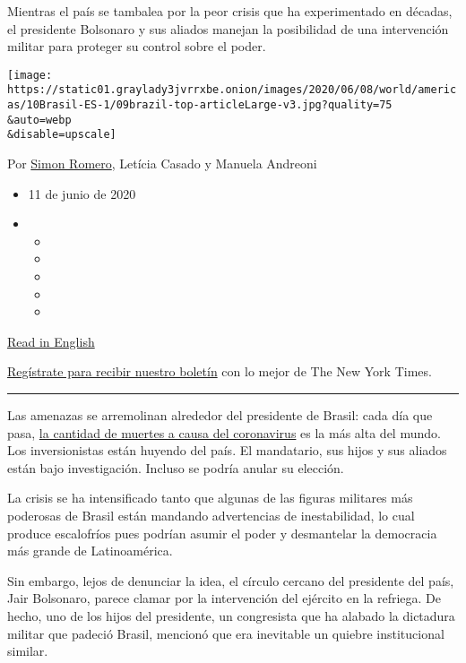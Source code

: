Mientras el país se tambalea por la peor crisis que ha experimentado en
décadas, el presidente Bolsonaro y sus aliados manejan la posibilidad de
una intervención militar para proteger su control sobre el poder.

\texttt{[image: https://static01.graylady3jvrrxbe.onion/images/2020/06/08/world/americas/10Brasil-ES-1/09brazil-top-articleLarge-v3.jpg?quality=75\\\&auto=webp\\\&disable=upscale]}

Por \href{https://www.nytimes3xbfgragh.onion/by/simon-romero}{Simon
Romero}, Letícia Casado y Manuela Andreoni

\begin{itemize}
\item
  11 de junio de 2020
\item
  \begin{itemize}
  \item
  \item
  \item
  \item
  \item
  \end{itemize}
\end{itemize}

\href{https://www.nytimes3xbfgragh.onion/2020/06/10/world/americas/bolsonaro-coup-coronavirus-brazil.html}{Read
in English}

\href{https://www.nytimes3xbfgragh.onion/newsletters/el-times}{Regístrate
para recibir nuestro boletín} con lo mejor de The New York Times.

\begin{center}\rule{0.5\linewidth}{\linethickness}\end{center}

Las amenazas se arremolinan alrededor del presidente de Brasil: cada día
que pasa,
\href{https://www.nytimes3xbfgragh.onion/interactive/2020/world/americas/brazil-coronavirus-cases.html}{la
cantidad de muertes a causa del coronavirus} es la más alta del mundo.
Los inversionistas están huyendo del país. El mandatario, sus hijos y
sus aliados están bajo investigación. Incluso se podría anular su
elección.

La crisis se ha intensificado tanto que algunas de las figuras militares
más poderosas de Brasil están mandando advertencias de inestabilidad, lo
cual produce escalofríos pues podrían asumir el poder y desmantelar la
democracia más grande de Latinoamérica.

Sin embargo, lejos de denunciar la idea, el círculo cercano del
presidente del país, Jair Bolsonaro, parece clamar por la intervención
del ejército en la refriega. De hecho, uno de los hijos del presidente,
un congresista que ha alabado la dictadura militar que padeció Brasil,
mencionó que era inevitable un quiebre institucional similar.


